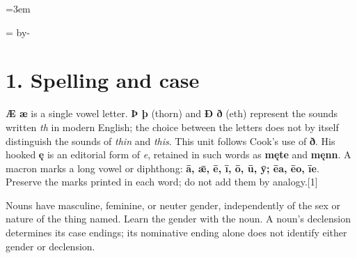 \newcommand{\runningtitle}{Unit 1. Nouns, the article, and the copula}

\emergencystretch=3em
\newcommand{\reserve}[1]{\par\penalty-100\begingroup\dimen0=\pagegoal\advance\dimen0 by-\pagetotal\ifdim\dimen0<#1\newpage\fi\endgroup}
\newcommand{\itempara}[2]{\par\addvspace{3pt}\begingroup\raggedright\noindent\hangindent=1.8em\hangafter=1\makebox[1.8em][l]{#1.}#2\par\endgroup}

\raggedright
{}

\reserve{4\baselineskip}
\section*{1. Spelling and case}

\textbf{Æ æ} is a single vowel letter. \textbf{Þ þ} (thorn) and \textbf{Ð ð} (eth) represent the sounds written \emph{th} in modern English; the choice between the letters does not by itself distinguish the sounds of \emph{thin} and \emph{this}. This unit follows Cook's use of \textbf{ð}. His hooked \textbf{ę} is an editorial form of \emph{e}, retained in such words as \textbf{męte} and \textbf{męnn}. A macron marks a long vowel or diphthong: \textbf{ā, ǣ, ē, ī, ō, ū, ȳ; ēa, ēo, īe}. Preserve the marks printed in each word; do not add them by analogy.[1]

Nouns have masculine, feminine, or neuter gender, independently of the sex or nature of the thing named. Learn the gender with the noun. A noun's declension determines its case endings; its nominative ending alone does not identify either gender or declension.

